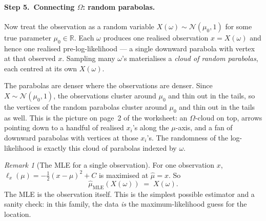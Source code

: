 \documentclass[a4paper,oneside,12pt]{extarticle}
\theoremstyle{plain}
\theoremstyle{definition}
\theoremstyle{remark}
\newtheorem{remark}[proposition]{Remark}
\begin{document}
\paragraph{Step 5.\ Connecting $\Omega$: random parabolas.}
Now treat the observation as a random variable $X(\omega) \sim
\mathcal{N}(\mu_0, 1)$ for some true parameter $\mu_0 \in \mathbb{R}$.
Each $\omega$ produces one realised observation $x = X(\omega)$ and
hence one realised pre-log-likelihood --- a single downward parabola
with vertex at that observed $x$.  Sampling many $\omega$'s
materialises a \emph{cloud of random parabolas}, each centred at
its own $X(\omega)$.

The parabolas are denser where the observations are denser.  Since
$X \sim \mathcal{N}(\mu_0, 1)$, the observations cluster around
$\mu_0$ and thin out in the tails, so the vertices of the random
parabolas cluster around $\mu_0$ and thin out in the tails as well.
This is the picture on page~2 of the worksheet: an $\Omega$-cloud
on top, arrows pointing down to a handful of realised $x_i$'s along
the $\mu$-axis, and a fan of downward parabolas with vertices at
those $x_i$'s.  The randomness of the log-likelihood is exactly this
cloud of parabolas indexed by $\omega$.

\begin{remark}[The MLE for a single observation]
For one observation $x$, $\ell_x(\mu) = -\tfrac{1}{2}(x-\mu)^2 + C$
is maximised at $\hat\mu = x$.  So
\[
  \widehat{\mu}_{\text{MLE}}(X(\omega)) \;=\; X(\omega).
\]
The MLE is the observation itself.  This is the simplest possible
estimator and a sanity check: in this family, the data \emph{is}
the maximum-likelihood guess for the location.
\end{remark}

\begin{center}
\end{center}
\end{document}
